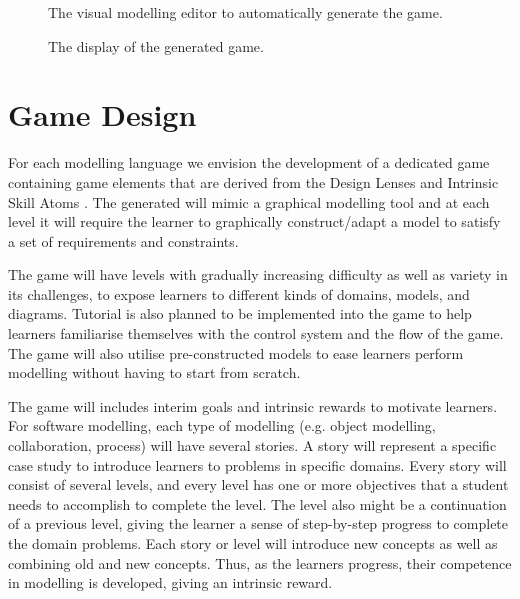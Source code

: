 \documentclass[runningheads,a4paper]{llncs}
\begin{document}
\begin{figure}[htb]
\centering
{}
\caption{The visual modelling editor to automatically generate the game.}
\label{fig:002}
\end{figure}

\begin{figure}[htb]
\centering
{}
\caption{The display of the generated game.}
\label{fig:001}
\end{figure}

\section{Game Design}
For each modelling language we envision the development of a dedicated game containing game elements that are derived from the Design Lenses and Intrinsic Skill Atoms \cite{deterding2015lens}. The generated will mimic a graphical modelling tool and at each level it will require the learner to graphically construct/adapt a model to satisfy a set of requirements and constraints.
	
The game will have levels with gradually increasing difficulty as well as variety in its challenges, to expose learners to different kinds of domains, models, and diagrams. Tutorial is also planned to be implemented into the game to help learners familiarise themselves with the control system and the flow of the game. The game will also utilise pre-constructed models to ease learners perform modelling without having to start from scratch.

The game will includes interim goals and intrinsic rewards to motivate learners. For software modelling, each type of modelling (e.g. object modelling, collaboration, process) will have several stories. A story will represent a specific case study to introduce learners to  problems in specific domains. Every story will consist of several levels, and every level has one or more objectives that a student needs to accomplish to complete the level. The level also might be a continuation of a previous level, giving the learner a sense of step-by-step progress to complete the domain problems. Each story or level will introduce new concepts as well as combining old and new concepts. Thus, as the learners progress, their competence in modelling is  developed, giving an intrinsic reward. 
\end{document}
